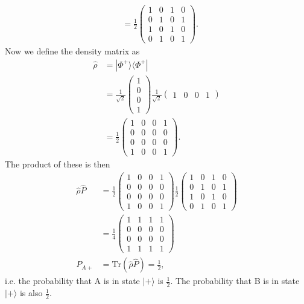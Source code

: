 \documentclass[lasers.tex]{subfiles}
\begin{document}
\begin{example}
\begin{align}
                &= \frac12 \begin{pmatrix} 1 & 0 & 1 & 0 \\ 0 & 1 & 0 & 1 \\ 1 & 0 & 1 & 0 \\ 0 & 1 & 0 & 1\end{pmatrix}.
    \end{align} 
    Now we define the density matrix as
    \begin{align}
        \hat{\rho} &= |\Phi^+\rangle\langle\Phi^+| \\
                   &= \frac{1}{\sqrt{2}}\begin{pmatrix} 1 \\ 0 \\ 0 \\ 1\end{pmatrix}\frac{1}{\sqrt{2}}\begin{pmatrix} 1 & 0 & 0 & 1\end{pmatrix} \\
                   &= \frac12 \begin{pmatrix} 1 & 0 & 0 & 1 \\ 0 & 0 & 0 & 0 \\0 & 0 & 0 & 0 \\ 1 & 0 & 0 & 1 \end{pmatrix}.
    \end{align}
    The product of these is then
    \begin{align}
        \hat{\rho}\hat{P} &= \frac12\begin{pmatrix} 1 & 0 & 0 & 1 \\ 0 &0&0 & 0 \\ 0 & 0 & 0 & 0 \\ 1 & 0 & 0 & 1\end{pmatrix}\frac12 \begin{pmatrix} 1 & 0 & 1 & 0 \\ 0 & 1 & 0 & 1 \\ 1 & 0 & 1 & 0 \\ 0 & 1 & 0 & 1\end{pmatrix} \\
                          &= \frac14\begin{pmatrix} 1&1&1&1\\0&0&0&0\\0&0&0&0\\1&1&1&1\end{pmatrix}\\
        P_{A+} &= \text{Tr}(\hat{\rho}\hat{P}) = \frac12,
    \end{align}
    i.e. the probability that A is in state $|+\rangle$ is $\frac12$.
    The probability that B is in state $|+\rangle$ is also $\frac12$.


\end{example}
\end{document}
